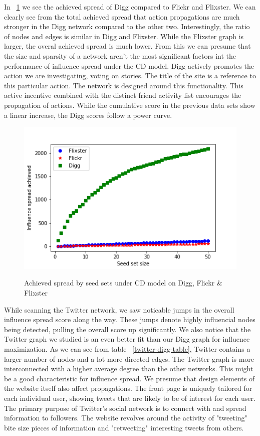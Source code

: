 \documentclass{acm_proc_article-sp}
\begin{document}
In ~\ref{spread3} we see the achieved spread of Digg compared to Flickr and Flixster. We can clearly see from the total achieved spread that action propagations are much stronger in the Digg network compared to the other two. Interestingly, the ratio of nodes and edges is similar in Digg and Flixster. While the Flixster graph is larger, the overal achieved spread is much lower. From this we can presume that the size and sparsity of a network aren't the most significant factors int the performance of influence spread under the CD model. Digg actively promotes the action we are investigating, voting on stories. The title of the site is a reference to this particular action. The network is designed around this functionality. This active incentive combined with the distinct friend activity list encourages the propagation of actions. While the cumulative score in the previous data sets show a linear increase, the Digg scores follow a power curve.

\begin{figure}[h]
	\includegraphics[width=\linewidth]{spread3.png}
	\centering
	\label{spread3}
    \caption{Achieved spread by seed sets under CD model on Digg, Flickr \& Flixster}
\end{figure}

While scanning the Twitter network, we saw noticable jumps in the overall influence spread score along the way. These jumps denote highly influencial nodes being detected, pulling the overall score up significantly. We also notice that the Twitter graph we studied is an even better fit than our Digg graph for influence maximization. As we can see from table ~\ref{twitter-digg-table}, Twitter contains a larger number of nodes and a lot more directed edges. The Twitter graph is more  interconnected with a higher average degree than the other networks. This might be a good characteristic for influence spread. We presume that design elements of the website itself also affect propagations. The front page is uniquely tailored for each individual user, showing tweets that are likely to be of interest for each user. The primary purpose of Twitter's social network is to connect with and spread information to followers. The website revolves around the activity of "tweeting" bite size pieces of information and "retweeting" interesting tweets from others.
\end{document}
